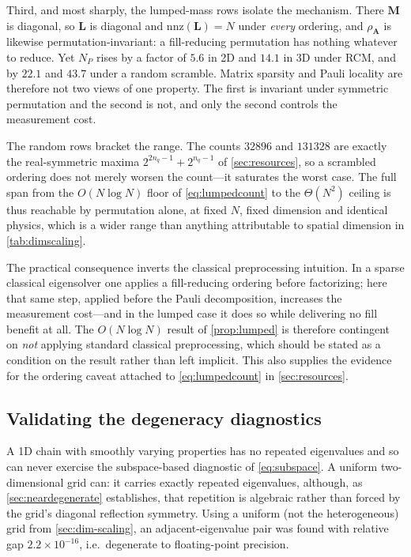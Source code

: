 \documentclass{ieeeaccess}
\newcommand{\M}{\mathbf{M}}
\newcommand{\A}{\mathbf{A}}
\begin{document}
Third, and most sharply, the lumped-mass rows isolate the mechanism. There $\M$ is diagonal, so
$\mathbf L$ is diagonal and $\mathrm{nnz}(\mathbf L)=N$ under \emph{every} ordering, and
$\rho_\A$ is likewise permutation-invariant: a fill-reducing permutation has nothing whatever
to reduce. Yet $N_P$ rises by a factor of $5.6$ in 2D and $14.1$ in 3D under RCM, and by
$22.1$ and $43.7$ under a random scramble. Matrix sparsity and Pauli locality are therefore not
two views of one property. The first is invariant under symmetric permutation and the second is
not, and only the second controls the measurement cost.

The random rows bracket the range. The counts $32896$ and $131328$ are exactly the
real-symmetric maxima $2^{2n_q-1}+2^{n_q-1}$ of \cref{sec:resources}, so a scrambled ordering
does not merely worsen the count---it saturates the worst case. The full span from the
$O(N\log N)$ floor of \cref{eq:lumpedcount} to the $\Theta(N^2)$ ceiling is thus reachable by
permutation alone, at fixed $N$, fixed dimension and identical physics, which is a wider range
than anything attributable to spatial dimension in \cref{tab:dimscaling}.

The practical consequence inverts the classical preprocessing intuition. In a sparse classical
eigensolver one applies a fill-reducing ordering before factorizing; here that same step,
applied before the Pauli decomposition, increases the measurement cost---and in the lumped case
it does so while delivering no fill benefit at all. The $O(N\log N)$ result of
\cref{prop:lumped} is therefore contingent on \emph{not} applying standard classical
preprocessing, which should be stated as a condition on the result rather than left implicit.
This also supplies the evidence for the ordering caveat attached to \cref{eq:lumpedcount} in
\cref{sec:resources}.

\subsection{Validating the degeneracy diagnostics}
\label{sec:dim-degeneracy}

A 1D chain with smoothly varying properties has no repeated eigenvalues and so can never exercise the subspace-based diagnostic of \cref{eq:subspace}. A uniform two-dimensional grid can: it carries exactly repeated eigenvalues, although, as \cref{sec:neardegenerate} establishes, that repetition is algebraic rather than forced by the grid's diagonal reflection symmetry. Using a uniform (not the heterogeneous) grid from \cref{sec:dim-scaling}, an adjacent-eigenvalue pair was found with relative gap $2.2\times10^{-16}$, i.e.\ degenerate to floating-point precision.
\end{document}
